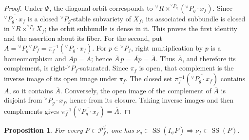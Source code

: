 \documentclass[10pt]{amsart}
\numberwithin{equation}{section}
\theoremstyle{plain}
\newtheorem{proposition}{Proposition}[section]
\theoremstyle{definition}
\theoremstyle{remark}
\newcommand{\vR}{{}^{\vee}R}
\newcommand{\vP}{{}^{\vee}P}
\newcommand{\SSupp}{\operatorname{SS}}
\begin{document}
\begin{proof}
Under $\Phi$, the diagonal orbit corresponds to
$\vR\times^{\vP_g}(\vP_g\cdot x_f)$. Since
$\overline{\vP_g\cdot x_f}$ is a closed $\vP_g$-stable subvariety of
$X_f$, its associated subbundle is closed in
$\vR\times^{\vP_g}X_f$; the orbit subbundle is dense in it. This proves
the first identity and the assertion about its fiber. For the second,
put $A=\vP_g\vP_f=\pi_f^{-1}(\vP_g\cdot x_f)$. For $p\in\vP_f$,
right multiplication by $p$ is a homeomorphism and $Ap=A$; hence
$\overline A\,p=\overline{Ap}=\overline A$. Thus $\overline A$, and
therefore its complement, is right-$\vP_f$-saturated. Since $\pi_f$ is
open, that complement is the inverse image of its open image under
$\pi_f$. The closed set
$\pi_f^{-1}(\overline{\vP_g\cdot x_f})$ contains $A$, so it contains
$\overline A$. Conversely, the open image of the complement of
$\overline A$ is disjoint from $\vP_g\cdot x_f$, hence from its closure.
Taking inverse images and then complements gives
$\pi_f^{-1}(\overline{\vP_g\cdot x_f})=\overline A$.
\end{proof}

\begin{proposition}\label{prop:propagation}
For every $P\in\mathcal P_f^\psi$, one has
$\nu_g\in\SSupp(I_\psi P)\Longrightarrow\nu_f\in\SSupp(P)$.
\end{proposition}
\end{document}
